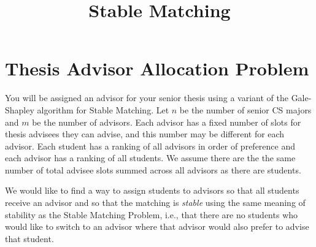\documentclass[12pt]{article}
\title{Stable Matching}
\date{}
\begin{document}
\maketitle


\section*{Thesis Advisor Allocation Problem}
You will be assigned an advisor for your senior thesis using a variant of the Gale-Shapley algorithm for Stable Matching.  Let $n$ be the number of senior CS majors and $m$ be the number of advisors.  Each advisor has a fixed number of slots for thesis advisees they can advise, and this number may be different for each advisor.  Each student has a ranking of all advisors in order of preference and each advisor has a ranking of all students.  We assume there are the the same number of total advisee slots summed across all advisors as there are students.

We would like to find a way to assign students to advisors so that all students receive an advisor and so that the matching is \emph{stable} using the same meaning of stability as the Stable Matching Problem, i.e., that there are no students who would like to switch to an advisor where that advisor would also prefer to advise that student.
\end{document}
